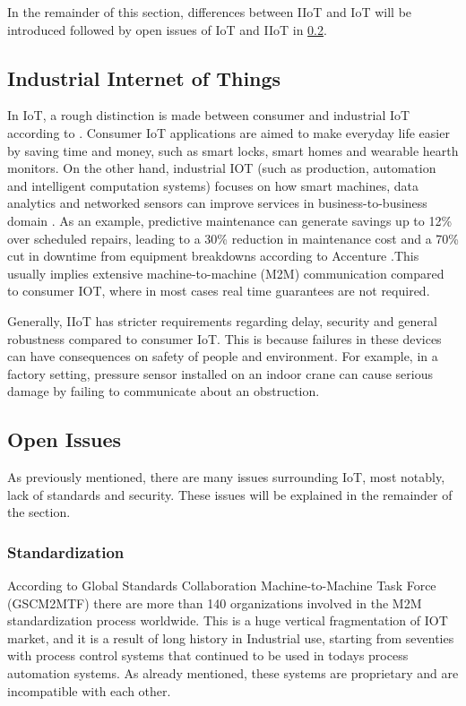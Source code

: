 In the remainder of this section, differences between IIoT and IoT will be introduced followed by open issues of IoT and IIoT  in \ref{section:OpenIssues}.


\subsection{Industrial Internet of Things}

In IoT, a rough distinction is made between consumer and industrial IoT according to \cite{Bandyopadhyay2011}. Consumer IoT applications are aimed to make everyday life easier by saving time and money, such as smart locks, smart homes and wearable hearth monitors. On the other hand, industrial IOT (such as production, automation and intelligent computation systems) focuses on how smart machines, data analytics and networked sensors can improve services in business-to-business domain 
\cite{Palattella2016}. As an example, predictive maintenance can generate savings up to 12\% over scheduled repairs, leading to a 30\% reduction in maintenance cost and a 70\% cut in downtime from equipment breakdowns according to Accenture \cite{accenture}.This usually implies extensive machine-to-machine (M2M) communication compared to consumer IOT, where in most cases real time guarantees are not required.

Generally, IIoT has stricter requirements regarding delay, security and general robustness compared to consumer IoT. This is because failures in these devices can have consequences on safety of people and environment. For example, in a factory setting, pressure sensor installed on an indoor crane can cause serious damage by failing to communicate about an obstruction.

\subsection{Open Issues}
\label{section:OpenIssues}
As previously mentioned, there are many issues surrounding IoT, most notably, lack of standards and security. These issues will be explained in the remainder of the section.

\subsubsection{Standardization}
\label{section:Standardization}

According to Global Standards Collaboration Machine-to-Machine Task Force (GSCM2MTF) there are more than 140 organizations involved in the M2M standardization process worldwide.  
This is a huge vertical fragmentation of IOT market, and it is a result of long history in Industrial use, starting from seventies with process control systems that continued to be used in todays process automation systems. As already mentioned, these systems are proprietary and are incompatible with each other.

